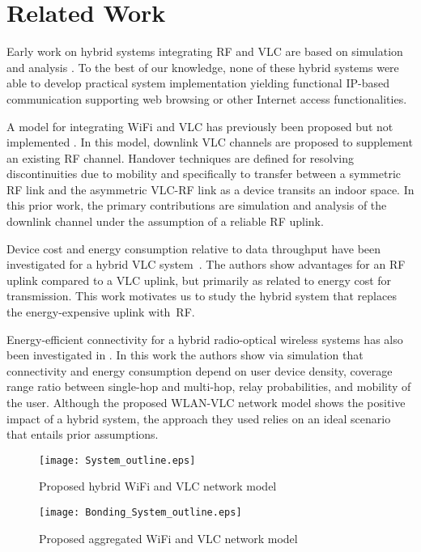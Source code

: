 \documentclass[10pt,journal]{IEEEtran}
\begin{document}
\section{Related Work}\label{sec2}
Early work on hybrid systems integrating RF and VLC are based on
simulation and analysis \cite{rahaim2011hybrid,lee2013performance,chowdhury2013energy,huang2013design}.
To the best of our knowledge, none of these hybrid systems were able to develop
practical system implementation yielding functional IP-based communication
supporting web browsing or other Internet access functionalities.


A model for integrating WiFi and VLC has previously been
proposed but not implemented \cite{rahaim2011hybrid}. In this model, downlink VLC
channels are proposed to supplement an existing RF channel. Handover
techniques are defined for resolving discontinuities due to mobility
and specifically to transfer between a symmetric RF link and the
asymmetric VLC-RF link as a device transits an indoor space. In this
prior work, the primary contributions are simulation and analysis of
the downlink channel under the assumption of a reliable RF uplink.

Device cost and energy consumption relative to data throughput have
been investigated for a hybrid VLC system~\cite{lee2013performance}. The authors show advantages for an RF
uplink compared to a VLC uplink, but primarily as related to energy
cost for transmission. This work motivates us to study the hybrid system
that replaces the energy-expensive uplink with~RF.

Energy-efficient connectivity for a hybrid radio-optical wireless
systems has also been investigated in \cite{chowdhury2013energy}. In this
work the authors show via simulation that connectivity and energy consumption depend
on user device density, coverage range ratio between single-hop and
multi-hop, relay probabilities, and mobility of the user. Although the
proposed WLAN-VLC network model shows the positive impact of a
hybrid system, the approach they used relies on an ideal scenario that entails prior
assumptions.

\begin{figure}
\centering
\texttt{[image: System\_outline.eps]}
\caption{Proposed hybrid WiFi and VLC network model}
\label{fig_system_outline}
\end{figure}

\begin{figure}
\centering
\texttt{[image: Bonding\_System\_outline.eps]}
\caption{Proposed aggregated WiFi and VLC network model}
\label{fig_bonding_system_outline}
\end{figure}
\end{document}
